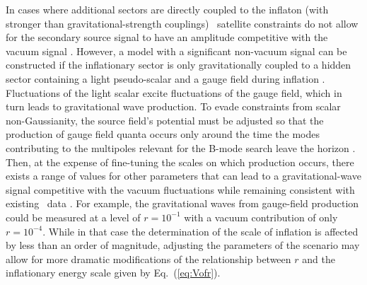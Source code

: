 
In cases where additional sectors are directly coupled to the inflaton (with stronger than gravitational-strength couplings) \planck\ satellite constraints do not allow for the secondary source signal to have an amplitude competitive with the vacuum signal \cite{Ozsoy:2014sba,Mirbabayi:2014jqa}. However, a model with a significant non-vacuum signal can be constructed if the inflationary sector is only gravitationally coupled to a hidden sector containing a light pseudo-scalar and a gauge field during inflation \cite{Barnaby:2012xt,Peloso:2016gqs}. Fluctuations of the light scalar excite fluctuations of the gauge field, which in turn leads to gravitational wave production. To evade constraints from scalar non-Gaussianity, the source field's potential must be adjusted so that the production of gauge field quanta occurs only around the time the modes contributing to the multipoles relevant for the B-mode search leave the horizon \cite{Namba:2015gja}. Then, at the expense of fine-tuning the scales on which production occurs, there exists a range of values for other parameters that can lead to a gravitational-wave signal competitive with the vacuum fluctuations while remaining consistent with existing \planck\ data \cite{Namba:2015gja,Peloso:2016gqs}. For example, the gravitational waves from gauge-field production could be measured at a level of $r=10^{-1}$ with a vacuum contribution of only $r=10^{-4}$. While in that case the determination of the scale of inflation is affected by less than an order of magnitude, adjusting the parameters of the scenario may allow for more dramatic modifications of the relationship between $r$ and the inflationary energy scale given by Eq.~(\ref{eq:Vofr}). 

